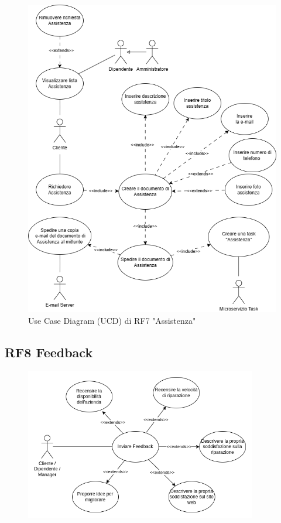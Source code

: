 \documentclass{report}
\begin{document}
\begin{figure}[H]
	\centering\includegraphics[width=1\textwidth]{images/UCD/RF7_assistenza_UCD.png}
	Use Case Diagram (UCD) di RF7 "Assistenza"
\end{figure}


\subsection*{RF8 Feedback}

\begin{figure}[H]
	\centering\includegraphics[width=0.9\textwidth]{images/feedback_UCD.png}
\end{figure}
\end{document}
